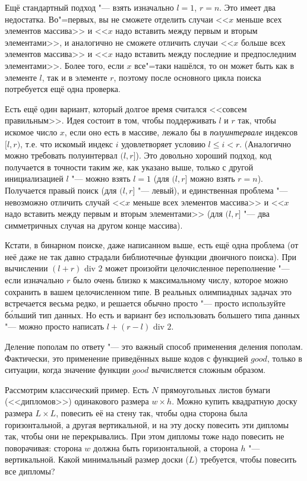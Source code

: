 \documentclass[a4paper,10pt]{problems}
\begin{document}
Ещё стандартный подход "--- взять изначально $l=1$, $r=n$. Это имеет два недостатка. 
Во"=первых, вы не сможете отделить случаи <<$x$ меньше всех элементов массива>> и 
<<$x$ надо вставить между первым и вторым элементами>>, 
и аналогично не сможете отличить случаи <<$x$ больше всех элементов массива>> и 
<<$x$ надо вставить между последние и предпоследним элементами>>.
Более того, если $x$ все"=таки нашёлся, то он может быть как в элементе $l$,
так и в элементе $r$, поэтому после основного цикла поиска потребуется ещё одна проверка.

Есть ещё один вариант, который долгое время считался <<совсем правильным>>. 
Идея состоит в том, чтобы поддерживать $l$ и $r$ так, чтобы искомое число $x$, 
если оно есть в массиве, лежало бы в \textit{полуинтервале} индексов $[l,r)$,
т.е. что искомый индекс $i$ удовлетворяет условию $l\leq i<r$.
(Аналогично можно требовать полуинтервал $(l,r]$).
Это довольно хороший подход, код получается в точности таким же, 
как указано выше, только с другой инициализацией $l$ "--- можно взять $l=1$
(для $(l,r]$ можно взять $r=n$).
Получается правый поиск (для $(l,r]$ "--- левый), и единственная проблема
"--- невозможно отличить случай <<$x$ меньше всех элементов массива>> и 
<<$x$ надо вставить между первым и вторым элементами>>
(для $(l,r]$ "--- два симметричных случая на другом конце массива).

Кстати, в бинарном поиске, даже написанном выше, есть ещё одна проблема 
(от неё даже не так давно страдали библиотечные функции двоичного поиска).
При вычислении $(l+r)\mbox{ div }2$ может произойти целочисленное переполнение "---
если изначально $r$ было очень близко к максимальному числу, которое можно
сохранить в вашем целочисленном типе. 
В реальных олимпиадных задачах это встречается весьма редко, и решается 
обычно просто "--- просто используйте б\'{о}льший тип данных.
Но есть и вариант без использовать большего типа данных
"--- можно просто написать $l+(r-l)\mbox{ div } 2$.

Деление пополам по ответу "--- это важный способ применения деления пополам.
Фактически, это применение приведённых выше кодов с функцией $good$, только 
в ситуации, когда значение функции $good$ вычисляется сложным образом.

Рассмотрим классический пример. 
Есть $N$ прямоугольных листов бумаги (<<дипломов>>) одинакового размера 
$w\times h$. Можно купить квадратную доску размера $L\times L$, 
повесить её на стену так, чтобы одна сторона была горизонтальной,
а другая вертикальной, и на эту доску повесить эти дипломы так,
чтобы они не перекрывались. 
При этом дипломы тоже надо повесить не поворачивая: сторона $w$ должна быть
горизонтальной, а сторона $h$ "--- вертикальной.
Какой минимальный размер доски ($L$) требуется, чтобы повесить все дипломы?
\end{document}

